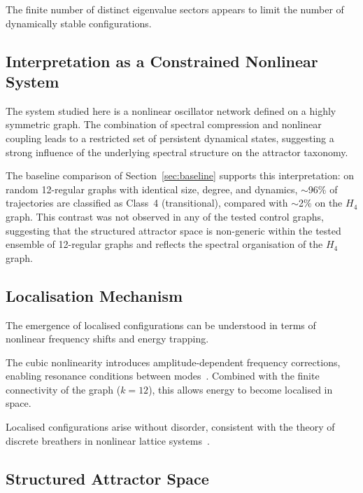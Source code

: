 \documentclass[12pt,a4paper]{article}
\newcommand{\Hfour}{H_4}
\begin{document}
The finite number of distinct eigenvalue sectors appears to limit the
number of dynamically stable configurations.

\subsection{Interpretation as a Constrained Nonlinear System}
\label{sec:disc_constrained}

The system studied here is a nonlinear oscillator network defined on
a highly symmetric graph.  The combination of spectral compression and
nonlinear coupling leads to a restricted set of persistent dynamical
states, suggesting a strong influence of the underlying spectral
structure on the attractor taxonomy.

The baseline comparison of Section~\ref{sec:baseline} supports this
interpretation: on random 12-regular graphs with identical size,
degree, and dynamics, $\sim$96\% of trajectories are classified as
Class~4 (transitional), compared with $\sim$2\% on the $\Hfour$ graph.
This contrast was not observed in any of the tested control graphs,
suggesting that the structured attractor space is non-generic within
the tested ensemble of 12-regular graphs and reflects the spectral
organisation of the $\Hfour$ graph.

\subsection{Localisation Mechanism}\label{sec:disc_localisation}

The emergence of localised configurations can be understood in terms
of nonlinear frequency shifts and energy trapping.

The cubic nonlinearity introduces amplitude-dependent frequency
corrections, enabling resonance conditions between
modes~\cite{flach2008,mackay1994}.  Combined with the finite
connectivity of the graph ($k = 12$), this allows energy to become
localised in space.

Localised configurations arise without disorder, consistent with the
theory of discrete breathers in nonlinear lattice
systems~\cite{aubry1997,mackay1994}.

\subsection{Structured Attractor Space}\label{sec:disc_finite}
\end{document}
